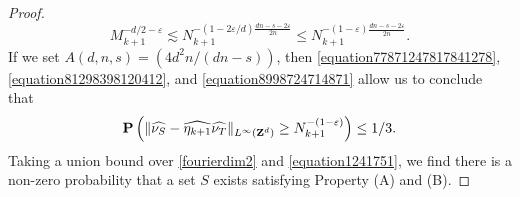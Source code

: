 \begin{proof}
\begin{equation}
        M_{k+1}^{-d/2 - \varepsilon} \lesssim N_{k+1}^{-(1 - 2\varepsilon/d) \frac{dn - s - 2\varepsilon}{2n}} \leq N_{k+1}^{-(1 - \varepsilon) \frac{dn - s - 2\varepsilon}{2n}}.
    \end{equation}
    If we set $A(d,n,s) = (4d^2n/(dn - s))$, then \eqref{equation77871247817841278}, \eqref{equation81298398120412}, and \eqref{equation8998724714871} allow us to conclude that
    \begin{equation} \label{equation1241751}
        \operatorname{\mathbf{P}} \left( \| \widehat{\nu_S} - \widehat{\eta_{k+1}} \widehat{\nu_T} \|_{L^\infty(\operatorname{\mathbf{Z}}^d)} \geq N_{k+1}^{-(1 - \varepsilon)} \right) \leq 1/3.
    \end{equation}
    Taking a union bound over \eqref{fourierdim2} and \eqref{equation1241751}, we find there is a non-zero probability that a set $S$ exists satisfying Property (A) and (B).
    \begin{comment}

    Then for each $m \in \mathbf{Z}^d$,
    \[ \widehat{\nu_S}(m) - \widehat{\eta_{k+1}}(m) \widehat{\nu_T}(m) = \sum_{Q \in \DQ_{k+1}(T)} A_Q e^{-\frac{2 \pi i m \cdot a(Q)}{N_1 \dots N_{k+1}}}. \]
    We calculate that for each $Q \in \DQ_{k+1}(T)$,
    \begin{align*}
        \EE[A_Q|\#(\DQ_k(S))] &= \frac{\PP (X_Q = 1 | \#(\DQ_k(S)))}{\#(\DQ_{k+1}(S))} - \frac{1}{N_{k+1}^d \#(\DQ_{k+1}(T))}\\
        &= \frac{\#(\DQ_{k+1}(S)) / N_{k+1}^d \#(\DQ_{k+1}(T))}{\#(\DQ_{k+1}(S))} - \frac{1}{N_{k+1}^d \#(\DQ_{k+1}(T))} = 0.
    \end{align*}
    In particular, $\EE[A_Q] = 0$. Now for each $q \geq 1$,
    \begin{align*}
        \EE[A_Q^q|\DQ_{k+1}(S)] &= \frac{\PP(X_Q = 1 | \DQ_{k+1}(S))}{\#(\DQ_{k+1}(S))^q} &= \frac{1}{\#(\DQ_{k+1}(T)) \cdot \#(\DQ_{k+1}(S))^{q-1}}.
    \end{align*}
    Thus
    \begin{align*}
        \EE[A_Q^q] &= \frac{1}{\#(\DQ_{k+1}(T))} \EE \left[ \frac{1}{\#(\DQ_{k+1}(S))^{q-1}} \right]\\
        &\leq s
    \end{align*}


    Now fix $m \in \{ -N_1 \dots N_{k+1}, N_1 \dots N_{k+1} \}^d$.




\end{comment}
\end{proof}
